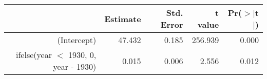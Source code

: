 \begin{table}[ht]
\centering
\begin{tabular}{rrrrr}
  \hline
 & Estimate & Std. Error & t value & Pr($>$$|$t$|$) \\ 
  \hline
(Intercept) & 47.432 & 0.185 & 256.939 & 0.000 \\ 
  ifelse(year $<$ 1930, 0, year - 1930) & 0.015 & 0.006 & 2.556 & 0.012 \\ 
   \hline
\end{tabular}
\end{table}
